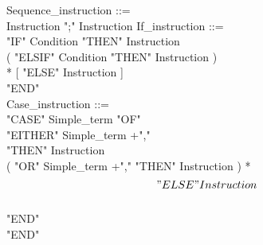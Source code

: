 \documentclass[12pt,a4paper,draft]{report}
\begin{document}
{\begin{sloppypar}
Sequence\_instruction ::= \\
   Instruction  ";"  Instruction If\_instruction ::= \\
  "IF"  Condition  "THEN"  Instruction  \\
  ( "ELSIF"  Condition  "THEN"  Instruction )\\
* [ "ELSE"  Instruction ] \\
  "END" \\
Case\_instruction ::= \\
  "CASE"  Simple\_term  "OF"\\
  "EITHER"  Simple\_term +","\\
  "THEN"  Instruction  \\
  ( "OR"  Simple\_term +","   "THEN"  Instruction ) *\\
  \[ "ELSE"  Instruction \] \\
  "END"\\
  "END" \\
  

\end{sloppypar}}
\end{document}
